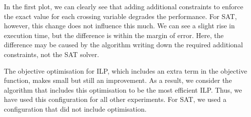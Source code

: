 In the first plot, we can clearly see that adding additional constraints to enforce the exact value for each crossing variable degrades the performance. For \textsf{SAT}, however, this change does not influence this much. We can see a slight rise in execution time, but the difference is within the margin of error. Here, the difference may be caused by the algorithm writing down the required additional constraints, not the SAT solver.

The objective optimisation for \textsf{ILP}, which includes an extra term in the objective function, makes small but still an improvement. As a result, we consider the algorithm that includes this optimisation to be the most efficient \textsf{ILP}. Thus, we have used this configuration for all other experiments. For \textsf{SAT}, we used a configuration that did not include optimisation.
